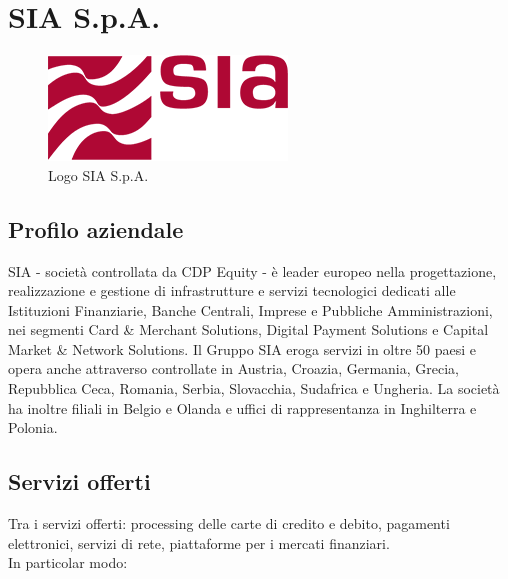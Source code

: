 \section{SIA S.p.A.}
\label{sec:sia}

\begin{figure}
\begin{center}
\includegraphics[width=0.5\columnwidth]{images/logo_sia.png}
\end{center}
\caption{Logo SIA S.p.A.}
\label{fig:logo_sia}
\end{figure}

\subsection{Profilo aziendale}
\label{subsec:siaprofilo}
SIA - società controllata da CDP Equity - è leader europeo nella progettazione, realizzazione e gestione di infrastrutture e servizi tecnologici dedicati alle Istituzioni Finanziarie, Banche Centrali, Imprese e Pubbliche Amministrazioni, nei segmenti Card \& Merchant Solutions, Digital Payment Solutions e Capital Market \& Network Solutions. Il Gruppo SIA eroga servizi in oltre 50 paesi e opera anche attraverso controllate in Austria, Croazia, Germania, Grecia, Repubblica Ceca, Romania, Serbia, Slovacchia, Sudafrica e Ungheria. La società ha inoltre filiali in Belgio e Olanda e uffici di rappresentanza in Inghilterra e Polonia.\cite{sia}


\subsection{Servizi offerti}
\label{subsec:siaservizi}

Tra i servizi offerti: processing delle carte di credito e debito, pagamenti elettronici, servizi di rete, piattaforme per i mercati finanziari.\cite{siasoluzioni} \\

In particolar modo: 

